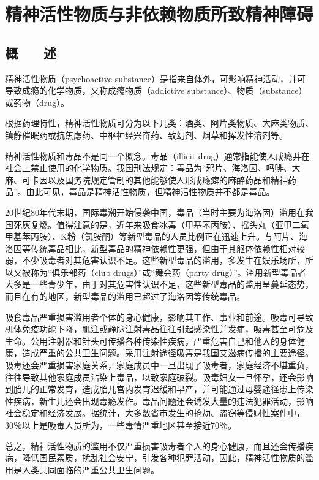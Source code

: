 \chapter{精神活性物质与非依赖物质所致精神障碍}

\section{概　　述}

精神活性物质（psychoactive
substance）是指来自体外，可影响精神活动，并可导致成瘾的化学物质，又称成瘾物质（addictive
substance）、物质（substance）或药物（drug）。

根据药理特性，精神活性物质可分为以下几类：酒类、阿片类物质、大麻类物质、镇静催眠药或抗焦虑药、中枢神经兴奋药、致幻剂、烟草和挥发性溶剂等。

精神活性物质和毒品不是同一个概念。毒品（illicit
drug）通常指能使人成瘾并在社会上禁止使用的化学物质。我国刑法规定：毒品为``鸦片、海洛因、吗啡、大麻、可卡因以及国务院规定管制的其他能够使人形成瘾癖的麻醉药品和精神药品''。由此可见，毒品是精神活性物质，但精神活性物质并不都是毒品。

20世纪80年代末期，国际毒潮开始侵袭中国，毒品（当时主要为海洛因）滥用在我国死灰复燃。值得注意的是，近年来吸食冰毒（甲基苯丙胺）、摇头丸（亚甲二氧甲基苯丙胺）、K粉（氯胺酮）等新型毒品的人员比例正在迅速上升。与阿片、海洛因等传统毒品相比，新型毒品的精神依赖性更强，但由于其躯体依赖性相对较弱，不少吸毒者对其危害认识不足。这些新型毒品的滥用，多发生在娱乐场所，所以又被称为``俱乐部药（club
drugs）''或``舞会药（party
drug）''。滥用新型毒品者大多是一些青少年，由于对其危害性认识不足，这些新型毒品的滥用呈蔓延态势，而且在有的地区，新型毒品的滥用已超过了海洛因等传统毒品。

吸食毒品严重损害滥用者个体的身心健康，影响其工作、事业和前途。吸毒可导致机体免疫功能下降，肌注或静脉注射毒品往往引起感染性并发症，吸毒甚至可危及生命。公用注射器和针头可传播各种传染性疾病，严重危害自己和他人的身体健康，造成严重的公共卫生问题。采用注射途径吸毒是我国艾滋病传播的主要途径。吸毒还会严重损害家庭关系，家庭成员中一旦出现了吸毒者，家庭经济不堪重负，往往导致其他家庭成员沾染上毒品，以致家庭破裂。吸毒妇女一旦怀孕，还会影响到胎儿的正常发育，造成胎儿宫内发育迟缓和早产，并可能通过母婴途径患上传染性疾病，新生儿还会出现毒瘾发作。毒品问题还会诱发大量的违法犯罪活动，影响社会稳定和经济发展。据统计，大多数省市发生的抢劫、盗窃等侵财性案件中，30％以上是吸毒人员所为，一些毒情严重地区甚至接近70％。

总之，精神活性物质的滥用不仅严重损害吸毒者个人的身心健康，而且还会传播疾病，降低国民素质，扰乱社会安宁，引发各种犯罪活动，因此，精神活性物质的滥用是人类共同面临的严重公共卫生问题。


